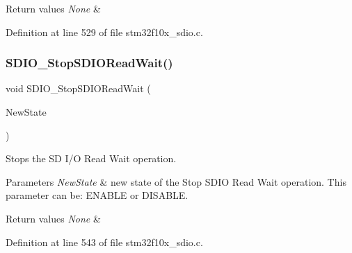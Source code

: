 \begin{DoxyRetVals}{Return values}
{\em None} & \\
\hline
\end{DoxyRetVals}


Definition at line 529 of file stm32f10x\+\_\+sdio.\+c.

\mbox{\label{group___s_d_i_o___private___functions_gaca6b25eb2debb73ac827c66f0ebcf837}} 
\subsubsection{\texorpdfstring{S\+D\+I\+O\+\_\+\+Stop\+S\+D\+I\+O\+Read\+Wait()}{SDIO\_StopSDIOReadWait()}}
{\footnotesize\ttfamily void S\+D\+I\+O\+\_\+\+Stop\+S\+D\+I\+O\+Read\+Wait (\begin{DoxyParamCaption}\item[{\hyperlink{group___exported__types_gac9a7e9a35d2513ec15c3b537aaa4fba1}{Functional\+State}}]{New\+State }\end{DoxyParamCaption})}



Stops the SD I/O Read Wait operation. 


\begin{DoxyParams}{Parameters}
{\em New\+State} & new state of the Stop S\+D\+IO Read Wait operation. This parameter can be\+: E\+N\+A\+B\+LE or D\+I\+S\+A\+B\+LE. \\
\hline
\end{DoxyParams}

\begin{DoxyRetVals}{Return values}
{\em None} & \\
\hline
\end{DoxyRetVals}


Definition at line 543 of file stm32f10x\+\_\+sdio.\+c.

\mbox{\label{group___s_d_i_o___private___functions_ga778d338c29df4fae9ef69432e6df32ad}} 

